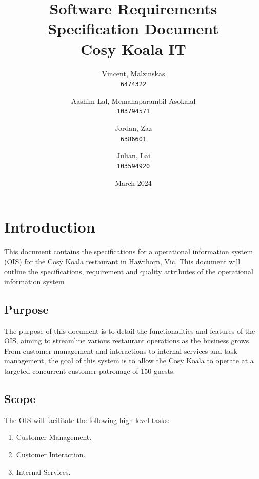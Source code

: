 \documentclass{article}
\title{Software Requirements Specification
Document\\
Cosy Koala IT}
\author{
  Vincent, Malzinskas\\
  \texttt{6474322}
  \and
  Aashim Lal, Memanaparambil Asokalal\\
  \texttt{103794571}
  \and
  Jordan, Zaz\\
  \texttt{6386601}
  \and
  Julian, Lai\\
  \texttt{103594920}
}
\date{March 2024}
\begin{document}
\maketitle
\newpage
\tableofcontents
\newpage


\section{Introduction}
This document contains the specifications for a operational information system (OIS) for the Cosy Koala restaurant in Hawthorn, Vic. This document will outline the specifications, requirement and quality attributes of the operational information system

\subsection{Purpose}
The purpose of this document is to detail the functionalities and features of the OIS, aiming to streamline various restaurant operations as the business grows. From customer management and interactions to internal services and task management, the goal of this system is to allow the Cosy Koala to operate at a targeted concurrent customer patronage of 150 guests.

\subsection{Scope}
The OIS will facilitate the following high level tasks:
\begin{enumerate}
    \item Customer Management.
    \item Customer Interaction.
    \item Internal Services.
\end{enumerate}
\end{document}
